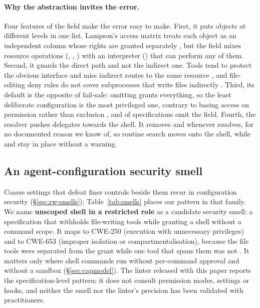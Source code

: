 \paragraph{Why the abstraction invites the error.}
Four features of the  field make the error easy to make. First, it puts objects at different levels in one
list. Lampson's access matrix treats each object as an independent column whose rights are granted separately
\citep{lampson1974protection}, but the field mixes resource operations (, , ) with an
interpreter () that can perform any of them. Second, it guards the direct path and not the indirect one.
Tools tend to protect the obvious interface and miss indirect routes to the same resource
\citep[\S4.2]{garfinkel2003traps}, and file-editing deny rules do not cover subprocesses that write files indirectly
\citep{AnthropicPermissionsDoc}. Third, its default is the opposite of fail-safe: omitting  grants
everything, so the least deliberate configuration is the most privileged one, contrary to basing access on permission
rather than exclusion \citep{saltzer1975protection}, and \RQtwoImplicitEng{} of specifications omit the field.
Fourth, the resolver pushes delegates towards the shell. It removes  and  whenever 
resolves, for no documented reason we know of, so routine search moves onto the shell, while  and
 stay in place without a warning.

\subsection{An agent-configuration security smell}
\label{sec:disc-smell}

Coarse settings that defeat finer controls beside them recur in configuration security (\S\ref{sec:rw-smells});
Table~\ref{tab:smells} places our pattern in that family. We name \textbf{unscoped shell in a restricted role} as a candidate security smell: a
specification that withholds file-writing tools while granting a shell without a command scope. It maps to CWE-250
(execution with unnecessary privileges) and to CWE-653 (improper isolation or compartmentalisation), because the file
tools were separated from the grant while one tool that spans them was not \citep{cwe250,cwe653}. It matters only
where shell commands run without per-command approval and without a sandbox (\S\ref{sec:capmodel}). The linter
released with this paper reports the specification-level pattern; it does not consult permission modes, settings or
hooks, and neither the smell nor the linter's precision has been validated with practitioners.

